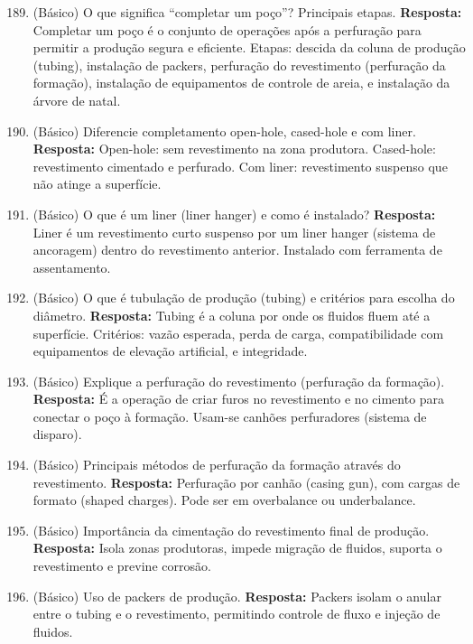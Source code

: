 \documentclass[11pt,a4paper]{article}
\begin{document}
\begin{enumerate}
  \setcounter{enumi}{188}
  \item (Básico) O que significa ``completar um poço''? Principais etapas.
  \textbf{Resposta:} Completar um poço é o conjunto de operações após a perfuração para permitir a produção segura e eficiente. Etapas: descida da coluna de produção (tubing), instalação de packers, perfuração do revestimento (perfuração da formação), instalação de equipamentos de controle de areia, e instalação da árvore de natal.

  \item (Básico) Diferencie completamento open-hole, cased-hole e com liner.
  \textbf{Resposta:} Open-hole: sem revestimento na zona produtora. Cased-hole: revestimento cimentado e perfurado. Com liner: revestimento suspenso que não atinge a superfície.

  \item (Básico) O que é um liner (liner hanger) e como é instalado?
  \textbf{Resposta:} Liner é um revestimento curto suspenso por um liner hanger (sistema de ancoragem) dentro do revestimento anterior. Instalado com ferramenta de assentamento.

  \item (Básico) O que é tubulação de produção (tubing) e critérios para escolha do diâmetro.
  \textbf{Resposta:} Tubing é a coluna por onde os fluidos fluem até a superfície. Critérios: vazão esperada, perda de carga, compatibilidade com equipamentos de elevação artificial, e integridade.

  \item (Básico) Explique a perfuração do revestimento (perfuração da formação).
  \textbf{Resposta:} É a operação de criar furos no revestimento e no cimento para conectar o poço à formação. Usam-se canhões perfuradores (sistema de disparo).

  \item (Básico) Principais métodos de perfuração da formação através do revestimento.
  \textbf{Resposta:} Perfuração por canhão (casing gun), com cargas de formato (shaped charges). Pode ser em overbalance ou underbalance.

  \item (Básico) Importância da cimentação do revestimento final de produção.
  \textbf{Resposta:} Isola zonas produtoras, impede migração de fluidos, suporta o revestimento e previne corrosão.

  \item (Básico) Uso de packers de produção.
  \textbf{Resposta:} Packers isolam o anular entre o tubing e o revestimento, permitindo controle de fluxo e injeção de fluidos.


\end{enumerate}
\end{document}
